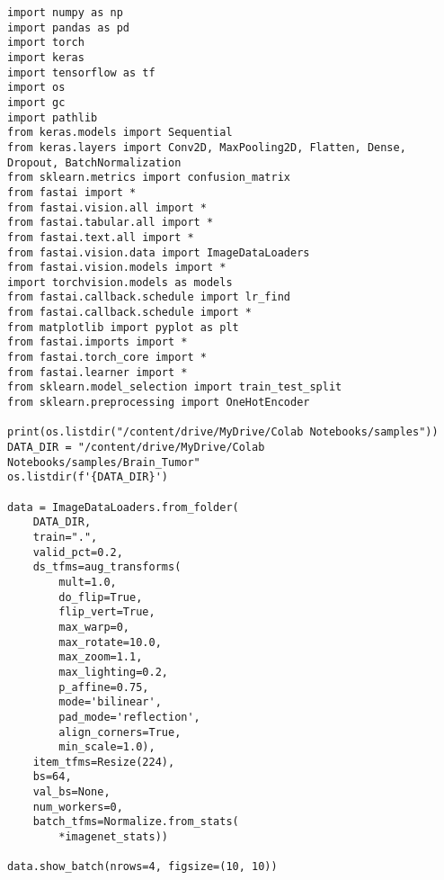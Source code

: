 \begin{verbatim}
import numpy as np
import pandas as pd
import torch
import keras
import tensorflow as tf
import os
import gc
import pathlib
from keras.models import Sequential
from keras.layers import Conv2D, MaxPooling2D, Flatten, Dense, Dropout, BatchNormalization
from sklearn.metrics import confusion_matrix
from fastai import *
from fastai.vision.all import *
from fastai.tabular.all import *
from fastai.text.all import *
from fastai.vision.data import ImageDataLoaders
from fastai.vision.models import *
import torchvision.models as models
from fastai.callback.schedule import lr_find
from fastai.callback.schedule import *
from matplotlib import pyplot as plt
from fastai.imports import *
from fastai.torch_core import *
from fastai.learner import *
from sklearn.model_selection import train_test_split
from sklearn.preprocessing import OneHotEncoder

print(os.listdir("/content/drive/MyDrive/Colab Notebooks/samples"))
DATA_DIR = "/content/drive/MyDrive/Colab Notebooks/samples/Brain_Tumor"
os.listdir(f'{DATA_DIR}')

data = ImageDataLoaders.from_folder(
    DATA_DIR,
    train=".",
    valid_pct=0.2,
    ds_tfms=aug_transforms(
        mult=1.0,
        do_flip=True,
        flip_vert=True,
        max_warp=0,
        max_rotate=10.0,
        max_zoom=1.1,
        max_lighting=0.2,
        p_affine=0.75,
        mode='bilinear',
        pad_mode='reflection',
        align_corners=True,
        min_scale=1.0),
    item_tfms=Resize(224),
    bs=64,
    val_bs=None,
    num_workers=0,
    batch_tfms=Normalize.from_stats(
        *imagenet_stats))

data.show_batch(nrows=4, figsize=(10, 10))


\end{verbatim}
